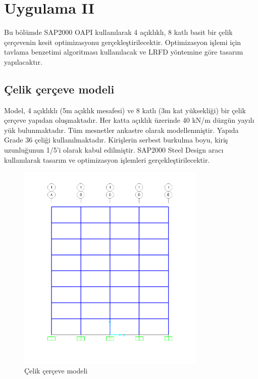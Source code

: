 \section{Uygulama II}
Bu bölümde SAP2000 OAPI kullanılarak 4 açıklıklı, 8 katlı basit bir çelik çerçevenin kesit optimizasyonu gerçekleştirilecektir. Optimizasyon işlemi için tavlama benzetimi algoritması kullanılacak ve LRFD yöntemine göre tasarım yapılacaktır.


\subsection{Çelik çerçeve modeli}
Model, 4 açıklıklı (5m açıklık mesafesi) ve 8 katlı (3m kat yüksekliği) bir çelik çerçeve yapıdan oluşmaktadır. Her katta açıklık üzerinde 40 kN/m düzgün yayılı yük bulunmaktadır. Tüm mesnetler ankastre olarak modellenmiştir. Yapıda Grade 36 çeliği kullanılmaktadır. Kirişlerin serbest burkulma boyu, kiriş uzunluğunun 1/5'i olarak kabul edilmiştir. SAP2000 Steel Design aracı kullanılarak tasarım ve optimizasyon işlemleri gerçekleştirilecektir.

\begin{figure}[H]
    \centering
    \includegraphics[width=0.8\textwidth]{weeks_new/imgs/exmp7_fig2.png}
    \caption{Çelik çerçeve modeli}
    \label{fig:model}
\end{figure}

